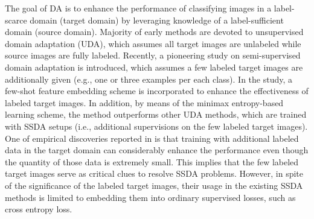 \documentclass[a4paper,conference]{IEEEtran}
\begin{document}
The goal of DA is to enhance the performance of classifying images in a label-scarce domain (target domain) by leveraging knowledge of a label-sufficient domain (source domain). Majority of early methods \cite{ganin2015dann, long2018cdan, volpi2018gan, hu2018duplex, saito2018mcd, french2018se, kurmi2018attention, gong2019dlow, ma2019gcan, choi2019pseudo} are devoted to unsupervised domain adaptation (UDA), which assumes all target images are unlabeled while source images are fully labeled. Recently, a pioneering study \cite{saito2019mme} on semi-supervised domain adaptation is introduced, which assumes a few labeled target images are additionally given (e.g., one or three examples per each class). In the study, a few-shot feature embedding scheme \cite{chen2019closer} is incorporated to enhance the effectiveness of labeled target images. In addition, by means of the minimax entropy-based learning scheme, the method outperforms other UDA methods, which are trained with SSDA setups (i.e., additional supervisions on the few labeled target images). One of empirical discoveries reported in \cite{saito2019mme} is that training with additional labeled data in the target domain can considerably enhance the performance even though the quantity of those data is extremely small. This implies that the few labeled target images serve as critical clues to resolve SSDA problems. However, in spite of the significance of the labeled target images, their usage in the existing SSDA methods is limited to embedding  them into ordinary supervised losses, such as cross entropy loss.




\end{document}
